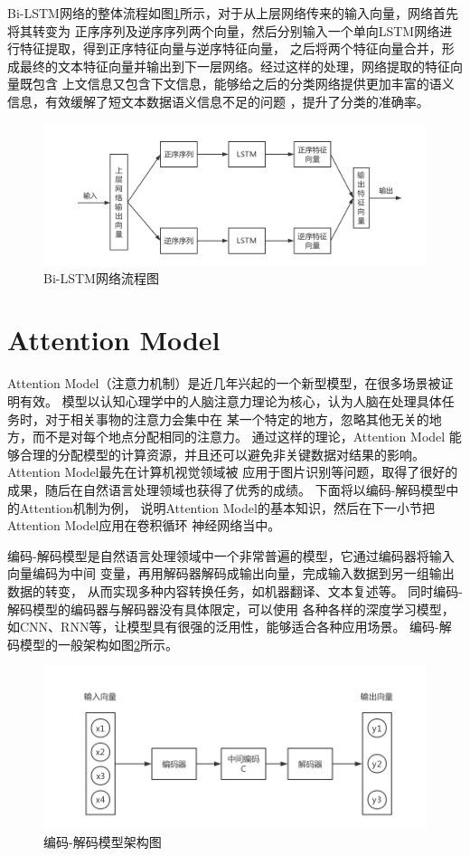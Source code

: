 Bi-LSTM网络的整体流程如图\ref{Bi-LSTM}所示，对于从上层网络传来的输入向量，网络首先将其转变为
正序序列及逆序序列两个向量，然后分别输入一个单向LSTM网络进行特征提取，得到正序特征向量与逆序特征向量，
之后将两个特征向量合并，形成最终的文本特征向量并输出到下一层网络。经过这样的处理，网络提取的特征向量既包含
上文信息又包含下文信息，能够给之后的分类网络提供更加丰富的语义信息，有效缓解了短文本数据语义信息不足的问题
，提升了分类的准确率。
\begin{figure}[h]
    \includegraphics[scale=0.4]{picture/Bi-LSTM.png}
    \caption{Bi-LSTM网络流程图}
    \label{Bi-LSTM}
\end{figure}

\section{Attention Model}
Attention Model（注意力机制）是近几年兴起的一个新型模型，在很多场景被证明有效。
模型以认知心理学中的人脑注意力理论为核心，认为人脑在处理具体任务时，对于相关事物的注意力会集中在
某一个特定的地方，忽略其他无关的地方，而不是对每个地点分配相同的注意力。
通过这样的理论，Attention Model
能够合理的分配模型的计算资源，并且还可以避免非关键数据对结果的影响。
Attention Model最先在计算机视觉领域被
应用于图片识别等问题，取得了很好的成果，随后在自然语言处理领域也获得了优秀的成绩。
下面将以编码-解码模型中的Attention机制为例，
说明Attention Model的基本知识，然后在下一小节把Attention Model应用在卷积循环
神经网络当中。

编码-解码模型是自然语言处理领域中一个非常普遍的模型，它通过编码器将输入向量编码为中间
变量，再用解码器解码成输出向量，完成输入数据到另一组输出数据的转变，
从而实现多种内容转换任务，如机器翻译、文本复述等。
同时编码-解码模型的编码器与解码器没有具体限定，可以使用
各种各样的深度学习模型，如CNN、RNN等，让模型具有很强的泛用性，能够适合各种应用场景。
编码-解码模型的一般架构如图\ref{Encoder}所示。
\begin{figure}[h]
    \includegraphics[scale=0.5]{picture/Encoder.png}
    \caption{编码-解码模型架构图}
    \label{Encoder}
\end{figure}

